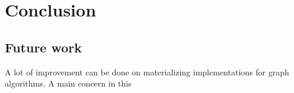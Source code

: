 \chapter{Conclusion}

\section{Future work}

A lot of improvement can be done on materializing implementations for graph algorithms. A main concern in this 

